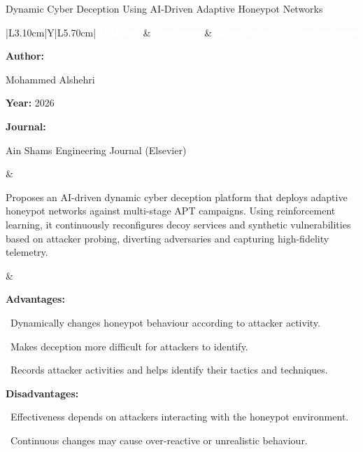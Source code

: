 \documentclass[aspectratio=169,10pt]{beamer}
\newcommand{\lrhdr}{%
  \rowcolor{prismNavy}%
  {\scriptsize\textcolor{white}{\textbf{Citation}}} &
  {\scriptsize\textcolor{white}{\textbf{Summary}}} &
  {\scriptsize\textcolor{white}{\textbf{Advantages \& Disadvantages}}} \\}
\begin{document}
\begin{frame}[t]{Dynamic Cyber Deception Using AI-Driven Adaptive Honeypot Networks}
\vspace{-0.30em}
{\footnotesize\setlength{\tabcolsep}{3.5pt}\renewcommand{\arraystretch}{1.10}
\begin{tabularx}{\textwidth}{|L{3.10cm}|Y|L{5.70cm}|}
\hline\lrhdr\hline
\begin{minipage}[t]{\linewidth}\fontsize{7.2pt}{9.2pt}\raggedright\selectfont
\textbf{Author:}\par
Mohammed Alshehri\par\vspace{4pt}
\textbf{Year:} 2026\par\vspace{4pt}
\textbf{Journal:}\par
Ain Shams Engineering Journal (Elsevier)\par\vspace{4pt}
\end{minipage}
&
\begin{minipage}[t]{\linewidth}\fontsize{7.2pt}{9.2pt}\raggedright\selectfont
Proposes an AI-driven dynamic cyber deception platform that deploys adaptive honeypot networks against multi-stage APT campaigns. Using reinforcement learning, it continuously reconfigures decoy services and synthetic vulnerabilities based on attacker probing, diverting adversaries and capturing high-fidelity telemetry.\par\vspace{4pt}
\end{minipage}
&
\begin{minipage}[t]{\linewidth}\fontsize{7.1pt}{8.8pt}\raggedright\selectfont
\textcolor{strengthGreen}{\textbf{Advantages:}}\par\vspace{1.3pt}
\textbullet~Dynamically changes honeypot behaviour according to attacker activity.\par\vspace{1.8pt}\textbullet~Makes deception more difficult for attackers to identify.\par\vspace{1.8pt}\textbullet~Records attacker activities and helps identify their tactics and techniques.\par\vspace{3.2pt}
\textcolor{limitRed}{\textbf{Disadvantages:}}\par\vspace{1.3pt}
\textbullet~Effectiveness depends on attackers interacting with the honeypot environment.\par\vspace{1.8pt}\textbullet~Continuous changes may cause over-reactive or unrealistic behaviour.\par\vspace{3pt}
\end{minipage} \\\hline
\end{tabularx}}
\end{frame}
\end{document}
